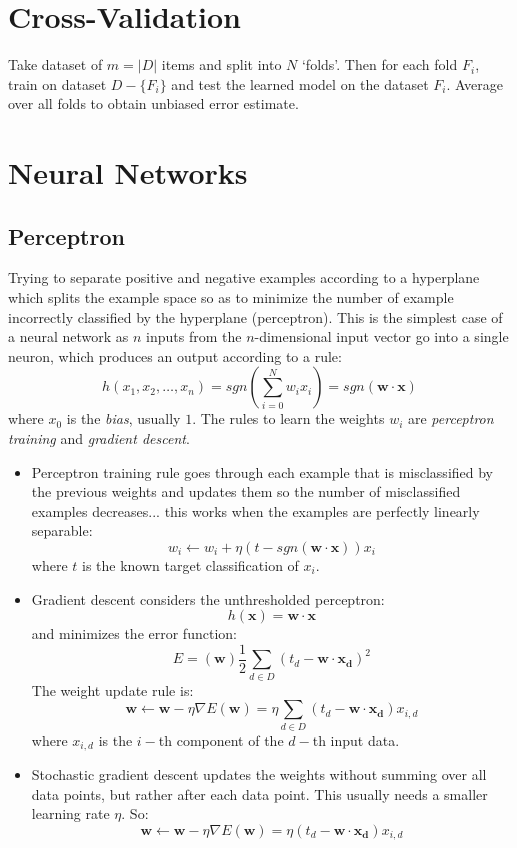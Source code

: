 \documentclass[a4paper,10pt]{article}
\begin{document}
\section{Cross-Validation}
Take dataset of $m = |D|$ items and split into $N$ `folds'.  Then for each fold $F_i$, train on dataset $D - \{F_i\}$ and test the learned model on the dataset $F_i$.  Average over all folds to obtain unbiased error estimate.

\section{Neural Networks}
\subsection{Perceptron}
Trying to separate positive and negative examples according to a hyperplane which splits the example space so as to minimize the number of example incorrectly classified by the hyperplane (perceptron).  This is the simplest case of a neural network as $n$ inputs from the $n$-dimensional input vector go into a single neuron, which produces an output according to a rule:
$$
h(x_1, x_2, \ldots, x_n) = sgn\left(\sum_{i=0}^N w_i x_i\right) = sgn(\mathbf{w}\cdot\mathbf{x})
$$
where $x_0$ is the \emph{bias}, usually $1$.  The rules to learn the weights $w_i$ are \emph{perceptron training} and \emph{gradient descent}.
\begin{itemize}
\item Perceptron training rule goes through each example that is misclassified by the previous weights and updates them so the number of misclassified examples decreases... this works when the examples are perfectly linearly separable:
$$
w_i \leftarrow w_i + \eta (t - sgn(\mathbf{w}\cdot\mathbf{x})) x_i
$$
where $t$ is the known target classification of $x_i$.
\item Gradient descent considers the unthresholded perceptron:
$$
h(\mathbf{x}) = \mathbf{w}\cdot\mathbf{x}
$$
and minimizes the error function:
$$
E = (\mathbf{w}) \frac{1}{2}\sum_{d\in D} (t_d - \mathbf{w}\cdot\mathbf{x_d})^2
$$
The weight update rule is:
$$
\mathbf{w} \leftarrow \mathbf{w} - \eta \nabla E(\mathbf{w}) = \eta \sum_{d\in D} (t_d - \mathbf{w}\cdot\mathbf{x_d})x_{i,d}
$$
where $x_{i,d}$ is the $i-$th component of the $d-$th input data.
\item Stochastic gradient descent updates the weights without summing over all data points, but rather after each data point.  This usually needs a smaller learning rate $\eta$.  So:
$$
\mathbf{w} \leftarrow \mathbf{w} - \eta \nabla E(\mathbf{w}) = \eta (t_d - \mathbf{w}\cdot\mathbf{x_d})x_{i,d}
$$
\end{itemize}
\end{document}
